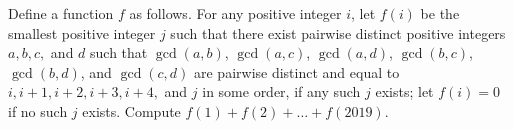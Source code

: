 Define a function $f$ as follows. For any positive integer $i$, let $f(i)$ be the smallest positive integer $j$ such that there exist pairwise distinct positive integers $a,b,c,$ and $d$ such that $\gcd(a,b)$, $\gcd(a,c)$, $\gcd(a,d)$, $\gcd(b,c)$, $\gcd(b,d)$, and $\gcd(c,d)$ are pairwise distinct and equal to $i, i+1, i+2, i+3, i+4,$ and $j$ in some order, if any such $j$ exists; let $f(i)=0$ if no such $j$ exists. Compute $f(1)+f(2)+\dots +f(2019)$.
